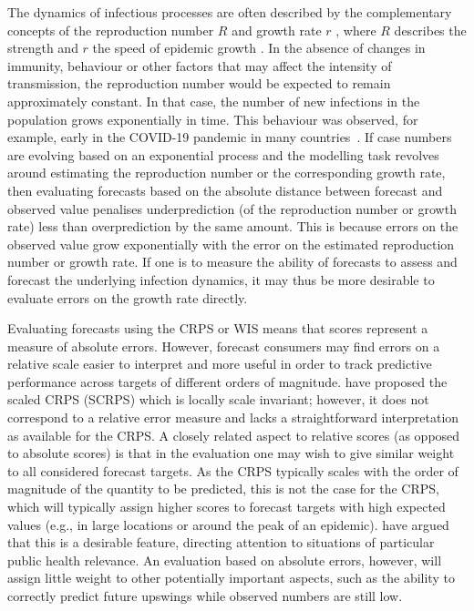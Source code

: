 \documentclass{article}
\begin{document}
The dynamics of infectious processes are often described by the complementary concepts of the reproduction number $R$ \citep{gosticPracticalConsiderationsMeasuring2020} and growth rate $r$ \citep{wallingaHowGenerationIntervals2007}, where $R$ describes the strength and $r$ the speed of epidemic growth \citep{dushoffSpeedStrengthEpidemic2021}.
In the absence of changes in immunity, behaviour or other factors that may affect the intensity of transmission, the reproduction number would be expected to remain approximately constant.
In that case, the number of new infections in the population grows exponentially in time.
This behaviour was observed, for example, early in the COVID-19 pandemic in many countries~\citep{pellisChallengesControlCOVID192021}.
If case numbers are evolving based on an exponential process and the  modelling task revolves around estimating the reproduction number or the corresponding growth rate, then evaluating forecasts based on the absolute distance between forecast and observed value penalises underprediction (of the reproduction number or growth rate) less than overprediction by the same amount. This is because errors on the observed value grow exponentially with the error on the estimated reproduction number or growth rate.
If one is to measure the ability of forecasts to assess and forecast the underlying infection dynamics, it may thus be more desirable to evaluate errors on the growth rate directly.

Evaluating forecasts using the CRPS or WIS means that scores represent a measure of absolute errors. However, forecast consumers may find errors on a relative scale easier to interpret and more useful in order to track predictive performance across targets of different orders of magnitude. 
\cite{bolinLocalScaleInvariance2021} have proposed the scaled CRPS (SCRPS) which is locally scale invariant; however, it does not correspond to a relative error measure and lacks a straightforward interpretation as available for the CRPS. %
A closely related aspect to relative scores (as opposed to absolute scores) is that in the evaluation one may wish to give similar weight to all considered forecast targets. As the CRPS typically scales with the order of magnitude of the quantity to be predicted, this is not the case for the CRPS, which will typically assign higher scores to forecast targets with high expected values (e.g., in large locations or around the peak of an epidemic). \cite{bracherEvaluatingEpidemicForecasts2021} have argued that this is a desirable feature, directing attention to situations of particular public health relevance. An evaluation based on absolute errors, however, will assign little weight to other potentially important aspects, such as the ability to correctly predict future upswings while observed numbers are still low. 
\end{document}
